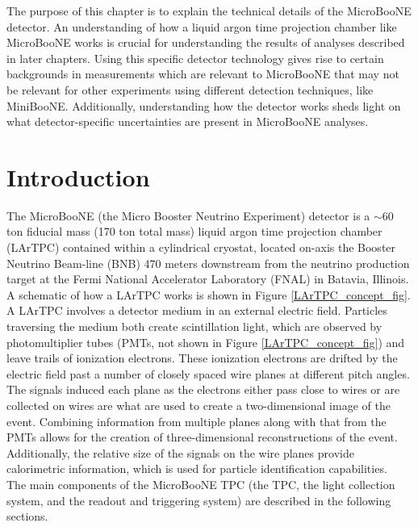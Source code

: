 The purpose of this chapter is to explain the technical details of the MicroBooNE detector. An understanding of how a liquid argon time projection chamber like MicroBooNE works is crucial for understanding the results of analyses described in later chapters. Using this specific detector technology gives rise to certain backgrounds in measurements which are relevant to MicroBooNE that may not be relevant for other experiments using different detection techniques, like MiniBooNE. Additionally, understanding how the detector works sheds light on what detector-specific uncertainties are present in MicroBooNE analyses.

\section{Introduction}
The MicroBooNE (the Micro Booster Neutrino Experiment) detector \cite{UBDetectorPaper} is a $\sim$60 ton fiducial mass (170 ton total mass) liquid argon time projection chamber (LArTPC) contained within a cylindrical cryostat, located on-axis the Booster Neutrino Beam-line (BNB) 470 meters downstream from the neutrino production target at the Fermi National Accelerator Laboratory (FNAL) in Batavia, Illinois. A schematic of how a LArTPC works is shown in Figure \ref{LArTPC_concept_fig}. A LArTPC involves a detector medium in an external electric field. Particles traversing the medium both create scintillation light, which are observed by photomultiplier tubes (PMTs, not shown in Figure \ref{LArTPC_concept_fig}) and leave trails of ionization electrons. These ionization electrons are drifted by the electric field past a number of closely spaced wire planes at different pitch angles. The signals induced each plane as the electrons either pass close to wires or are collected on wires are what are used to create a two-dimensional image of the event. Combining information from multiple planes along with that from the PMTs allows for the creation of three-dimensional reconstructions of the event. Additionally, the relative size of the signals on the wire planes provide calorimetric information, which is used for particle identification capabilities.\\

The main components of the MicroBooNE TPC (the TPC, the light collection system, and the readout and triggering system) are described in the following sections.


